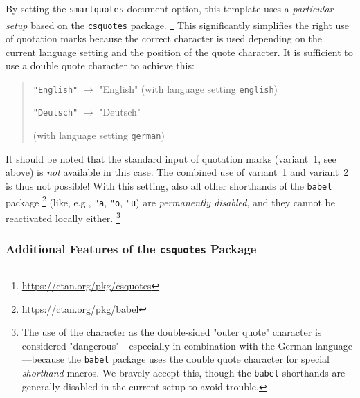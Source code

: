 By setting the \texttt{smartquotes} document option, this template uses a
\emph{particular setup} based on the \texttt{csquotes} package.%
\footnote{\url{https://ctan.org/pkg/csquotes}}
This significantly simplifies the right use of quotation marks because the
correct character is used depending on the current language setting and the
position of the quote character. It is sufficient to use a double quote
character \texttt{\textquotedbl} to achieve this:
%
\begin{quote}
	\verb!"English"! $\rightarrow$ "English" (with language setting
	\texttt{english})\\
	\begin{german}%
		\verb!"Deutsch"! $\rightarrow$ "Deutsch"
	\end{german}
	(with language setting \texttt{german})
\end{quote}
%
It should be noted that the standard input of quotation marks (variant~1, see
above) is \emph{not} available in this case. The combined use of variant~1 and
variant~2 is thus not possible! With this setting, also all other shorthands of
the \texttt{babel} package%
\footnote{\url{https://ctan.org/pkg/babel}}
(like, e.g., \verb!"a!, \verb!"o!, \verb!"u!) are \emph{permanently disabled},
and they cannot be reactivated locally either.%
\footnote{The use of the \texttt{\textquotedbl} character as the double-sided
"outer quote" character is considered "dangerous"---especially in combination
with the German language---because the \texttt{babel} package uses the double
quote character for special \emph{shorthand} macros. We bravely accept this,
though the \texttt{babel}-shorthands are generally disabled in the current
setup to avoid trouble.}

\subsubsection{Additional Features of the \texttt{csquotes} Package}


